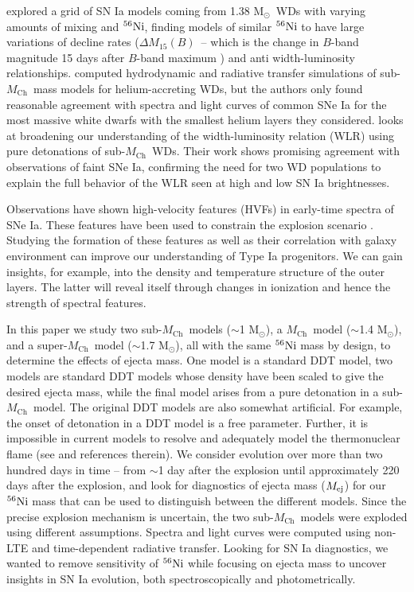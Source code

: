 \documentclass[useAMS,usenatbib,useasmath]{mnras}
\newcommand{\Mch}{\hbox{$M_{\text{Ch}}$}}
\newcommand{\Msun}{\hbox{M$_\odot$}}
\newcommand{\elem}[2][default]{$^{#1}{\rm #2}$}
\newcommand{\delM}{$\Delta M_{15}(B)$}
\begin{document}
\cite{Woosley2007} explored a grid of SN Ia models coming from 1.38 \Msun\ WDs with varying amounts of mixing and \elem[56]{Ni}, finding models of similar \elem[56]{Ni} to have large variations of decline rates (\delM\ -- which is the change in $B$-band magnitude 15 days after $B$-band maximum \citep{Phillips1993}) and anti width-luminosity relationships. \cite{Woosley2011} computed hydrodynamic and radiative transfer simulations of sub-\Mch\ mass models for helium-accreting WDs, but the authors only found reasonable agreement with spectra and light curves of common SNe Ia for the most massive white dwarfs with the smallest helium layers they considered. \cite{Blondin2017} looks at broadening our understanding of the width-luminosity relation (WLR) using pure detonations of sub-\Mch\ WDs. Their work shows promising agreement with observations of faint SNe Ia, confirming the need for two WD populations to explain the full behavior of the WLR seen at high and low SN Ia brightnesses.

Observations have shown high-velocity features (HVFs) in early-time spectra of SNe Ia. These features have been used to constrain the explosion scenario \citep{Mazzali2005a,Mazzali2005b,Tanaka2006, Blondin2013,Childress2013,Childress2014,Silverman2015,Zhao2015,Pan2015}. Studying the formation of these features as well as their correlation with galaxy environment can improve our understanding of Type Ia progenitors. We can gain insights, for example, into the density and temperature structure of the outer layers. The latter will reveal itself through changes in ionization and hence the strength of spectral features.
 
In this paper we study two sub-\Mch\ models ($\sim$1 \Msun), a 
\Mch\ model ($\sim$1.4 \Msun), and a super-\Mch\ model ($\sim$1.7 \Msun), all with the same \elem[56]{Ni} mass by design,  to determine the effects of ejecta mass. 
One model is a standard DDT model, two models are standard DDT models whose density have been scaled  to give the desired ejecta mass, while the final model arises from a pure detonation in a sub-\Mch\ model.
 The original DDT models are also somewhat artificial. For example, the onset of detonation in a DDT model is a free parameter. Further, it is impossible in current models to resolve and adequately model the thermonuclear flame (see \cite{Ciaraldi-Schoolmann2013} and references therein). We consider evolution over more than two hundred days in time -- from $\sim$1 day after the explosion until approximately 220 days after the explosion, and look for diagnostics of ejecta mass ($M_{\rm ej}$) for our \elem[56]{Ni} mass that can be used to distinguish between the different models. Since the precise explosion mechanism is uncertain, the two sub-\Mch\ models were exploded using different assumptions. Spectra and light curves were computed using non-LTE and time-dependent radiative transfer. Looking for SN Ia diagnostics, we wanted to remove sensitivity of \elem[56]{Ni} while focusing on ejecta mass to uncover insights in SN Ia evolution, both spectroscopically and photometrically.
\end{document}
